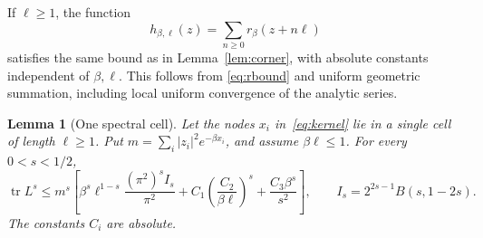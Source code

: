 \documentclass[11pt]{article}
\newtheorem{lemma}[theorem]{Lemma}
\numberwithin{equation}{section}
\newcommand{\tr}{\operatorname{tr}}
\begin{document}
If $\ell\ge1$, the function
\begin{equation}\label{eq:himage}
 h_{\beta,\ell}(z)=\sum_{n\ge0}r_\beta(z+n\ell)
\end{equation}
satisfies the same bound as in Lemma~\ref{lem:corner}, with absolute
constants independent of $\beta,\ell$. This follows from
\eqref{eq:rbound} and uniform geometric summation, including local
uniform convergence of the analytic series.

\begin{lemma}[One spectral cell]\label{lem:cell}
Let the nodes $x_i$ in~\eqref{eq:kernel} lie in a single cell of
length $\ell\ge1$. Put $m=\sum_i|z_i|^2e^{-\beta x_i}$, and assume
$\beta\ell\le1$. For every $0<s<1/2$,
\begin{equation}\label{eq:cellbound}
 \tr L^s\le m^s\left[
 \beta^s\ell^{1-s}\frac{(\pi^2)^s I_s}{\pi^2}
       +C_1\left(\frac{C_2}{\beta\ell}\right)^s
       +\frac{C_3\beta^s}{s^2}\right],
 \qquad I_s=2^{2s-1}B(s,1-2s).
\end{equation}
The constants $C_i$ are absolute.
\end{lemma}
\end{document}
